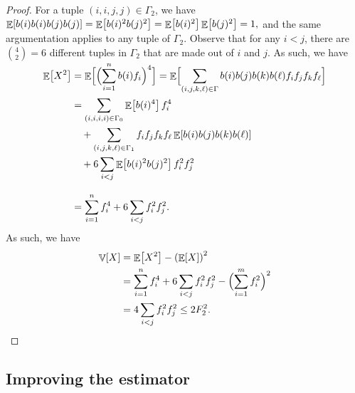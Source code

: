\begin{proof}
    For a tuple $(i,i,j,j) \in \Gamma_2$, we have
    \begin{math}
        \Ex{b(i) b(i) b(j) b(j)}%
        =%
        \Ex{b(i)^2 b(j)^2}%
        =%
        \Ex{b(i)^2} \Ex{ b(j)^2} =%
        1,
    \end{math}
    and the same argumentation applies to any tuple of $\Gamma_2$.
    Observe that for any $i <j$, there are $\binom{4}{2} = 6$
    different tuples in $\Gamma_2$ that are made out of $i$ and $j$.
    As such, we have
    \begin{align*}
      \Ex{X^2}
      &=
        \Ex{\smash{ \Bigl(  \sum_{i=1}^n b(i) \frq_i \Bigr)^4}
        \Bigr.}%
        =%
        \Ex{\Bigr. \smash{  \sum_{(i,j,k,\ell) \in \Gamma} b(i)b(j)
        b(k) b(\ell)
        \frq_i\frq_j \frq_k \frq_\ell} %
        }
      \\[0.3cm]
      &%
        =%
        \sum_{(i,i,i,i) \in \Gamma_0} \Ex{b(i)^4} \frq_i^4
        \\&\quad+ \sum_{(i,j,k,\ell) \in \Gamma_1} \frq_i\frq_j \frq_k
        \frq_\ell \Ex{b(i) b(j) b(k) b(\ell)}
        \\&\quad+ 6 \sum_{i < j }  \Ex{b(i)^2 b(j)^2} \frq_i^2 \frq_j^2
      \\[0.3cm]
      &%
        =%
        \sum_{i=1}^n  \frq_i^4
        + 6 \sum_{i < j }  \frq_i^2 \frq_j^2.
    \end{align*}
    As such, we have
    \begin{align*}
        \Var{X}%
        &= %
        \Ex{X^2} - \pth{\Ex{X}}^2%
        \\&= %
        \sum_{i=1}^n  \frq_i^4
        + 6 \sum_{i < j }  \frq_i^2 \frq_j^2
        - \Bigl( \sum_{i=1}^m  \frq_i^2 \Bigr)^2
        \\&= %
        4 \sum_{i < j }  \frq_i^2 \frq_j^2 %
        \leq%
        2 \Frq_2^2.
    \end{align*}
\end{proof}


\subsection{Improving the estimator}

